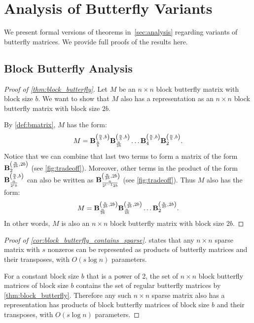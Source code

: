 \section{Analysis of Butterfly Variants}
\label{sec:butterfly_proofs}

We present formal versions of theorems in~\cref{sec:analysis} regarding variants
of butterfly matrices.
We provide full proofs of the results here.

\subsection{Block Butterfly Analysis}
\label{subsec:block_butterfly_proofs}

\begin{proof}[Proof of \cref{thm:block_butterfly}]
  Let $M$ be an $n \times n$ block butterfly matrix with block size $b$.
  We want to show that $M$ also has a representation as an $n \times n$ block
  butterfly matrix with block size $2b$.

  By \cref{def:bmatrix}, $M$ has the form:
  \begin{equation*}
    M = \mathbf{B}_{\frac{n}{b}}^{ \left( \frac{n}{b}, b \right)} \mathbf{B}_{\frac{n}{2b}}^{ \left( \frac{n}{b}, b \right)} \hdots \mathbf{B}_4^{ \left( \frac{n}{b}, b \right)} \mathbf{B}_2^{ \left( \frac{n}{b}, b \right)}.
  \end{equation*}
  Notice that we can combine that last two terms to form a matrix of the form
  $\mathbf{B}_2^{ \left( \frac{n}{2b}, 2b \right)}$ (see \cref{fig:tradeoff}).
  Moreover, other terms in the product of the form
  $\mathbf{B}_{\frac{n}{2^ib}}^{ \left( \frac{n}{b}, b \right)}$ can also be written as
  $\mathbf{B}_{\frac{n}{2^{i-1} 2b}}^{ \left( \frac{n}{2b}, 2b \right)}$ (see \cref{fig:tradeoff}).
  Thus $M$ also has the form:
  \begin{equation*}
    M = \mathbf{B}_{\frac{n}{2b}}^{ \left( \frac{n}{2b}, 2b \right)} \mathbf{B}_{\frac{n}{4b}}^{ \left( \frac{n}{2b}, 2b \right)} \hdots \mathbf{B}_2^{ \left( \frac{n}{2b}, 2b \right)}.
  \end{equation*}
  In other words, $M$ is also an $n \times n$ block butterfly matrix with block
  size $2b$.

\end{proof}

\begin{proof}[Proof of \cref{cor:block_butterfly_contains_sparse}]
  \citet[Theorem 3]{dao2020kaleidoscope} states that any $n \times n$ sparse
  matrix with $s$ nonzeros can be represented as products of butterfly matrices
  and their transposes, with $O(s \log n)$ parameters.

  For a constant block size $b$ that is a power of 2, the set of $n \times n$ block butterfly
  matrices of block size $b$ contains the set of regular butterfly matrices by
  \cref{thm:block_butterfly}.
  Therefore any such $n \times n$ sparse matrix also has a representation has
  products of block butterfly matrices of block size $b$ and their transposes,
  with $O(s \log n)$ parameters.
\end{proof}

